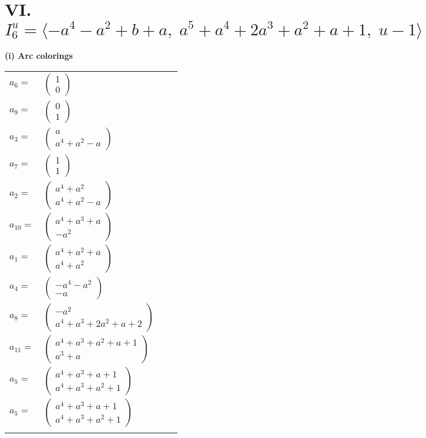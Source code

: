 \documentclass[1p]{elsarticle_modified}
\theoremstyle{definition}
\begin{document}
\centering \section*{VI. $I^u_{6}= \langle - a^4- a^2+b+a,\;a^5+a^4+2 a^3+a^2+a+1,\;u-1 \rangle$}
\flushleft \textbf{(i) Arc colorings}\\
\begin{tabular}{m{7pt} m{180pt} m{7pt} m{180pt} }
\flushright $a_{6}=$&$\begin{pmatrix}1\\0\end{pmatrix}$ \\
\flushright $a_{9}=$&$\begin{pmatrix}0\\1\end{pmatrix}$ \\
\flushright $a_{3}=$&$\begin{pmatrix}a\\a^4+a^2- a\end{pmatrix}$ \\
\flushright $a_{7}=$&$\begin{pmatrix}1\\1\end{pmatrix}$ \\
\flushright $a_{2}=$&$\begin{pmatrix}a^4+a^2\\a^4+a^2- a\end{pmatrix}$ \\
\flushright $a_{10}=$&$\begin{pmatrix}a^4+a^3+a\\- a^2\end{pmatrix}$ \\
\flushright $a_{1}=$&$\begin{pmatrix}a^4+a^2+a\\a^4+a^2\end{pmatrix}$ \\
\flushright $a_{4}=$&$\begin{pmatrix}- a^4- a^2\\- a\end{pmatrix}$ \\
\flushright $a_{8}=$&$\begin{pmatrix}- a^2\\a^4+a^3+2 a^2+a+2\end{pmatrix}$ \\
\flushright $a_{11}=$&$\begin{pmatrix}a^4+a^3+a^2+a+1\\a^3+a\end{pmatrix}$ \\
\flushright $a_{5}=$&$\begin{pmatrix}a^4+a^3+a+1\\a^4+a^3+a^2+1\end{pmatrix}$\\ \flushright $a_{5}=$&$\begin{pmatrix}a^4+a^3+a+1\\a^4+a^3+a^2+1\end{pmatrix}$\\&\end{tabular}
\end{document}
